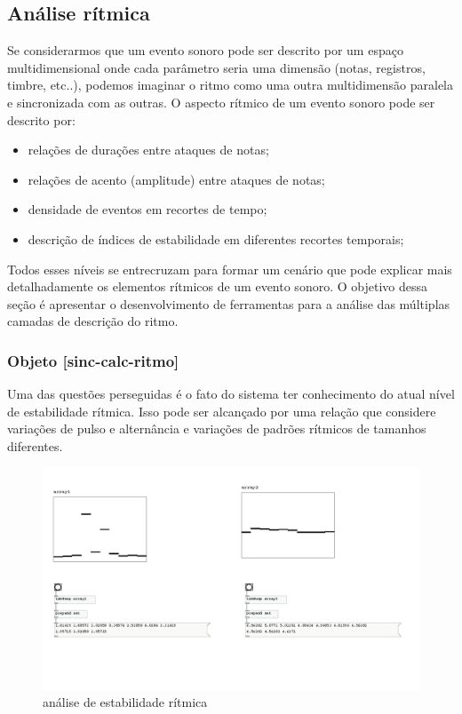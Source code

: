 \documentclass[draft]{ppgmus}
\begin{document}
\subsection{Análise rítmica}

Se considerarmos que um evento sonoro pode ser descrito por um espaço multidimensional
onde cada parâmetro seria uma dimensão (notas, registros, timbre, etc..), podemos
imaginar o ritmo como uma outra multidimensão paralela e sincronizada com as outras.
O aspecto rítmico de um evento sonoro pode ser descrito por:
\begin{itemize}
 \item relações de durações entre ataques de notas;
\item relações de acento (amplitude) entre ataques de notas;
\item densidade de eventos em recortes de tempo;
\item descrição de índices de estabilidade em diferentes recortes temporais;
\end{itemize}

Todos esses níveis se entrecruzam para formar um cenário que pode explicar mais detalhadamente
os elementos rítmicos de um evento sonoro. O objetivo dessa seção é apresentar o desenvolvimento de
ferramentas para a análise das múltiplas camadas de descrição do ritmo.


% 



\subsubsection{Objeto [sinc-calc-ritmo]}

Uma das questões perseguidas é o fato do sistema ter conhecimento do atual nível de 
estabilidade rítmica. Isso pode ser alcançado por uma relação que considere variações
de pulso e alternância e variações de padrões rítmicos de tamanhos diferentes.

\begin{figure}
\includegraphics[scale=.6]{prot5a}
\caption{análise de estabilidade rítmica}
\label{prot5a}
\end{figure} 
\end{document}
